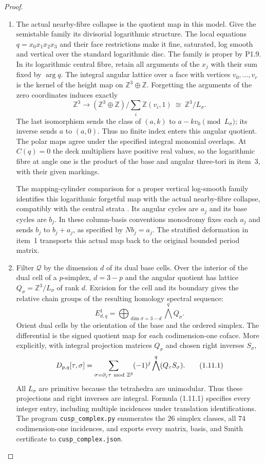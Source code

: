 \begin{proof}
\begin{enumerate}[label=\arabic*.]
\item The actual nearby-fibre collapse is the quotient map in this model.
Give the semistable family its divisorial logarithmic structure.
The local equations $q=x_0x_1x_2x_3$ and their face restrictions
make it fine, saturated, log smooth and vertical over the standard
logarithmic disc.  The family is proper by P1.9.
In its logarithmic central fibre, retain all arguments of the $x_j$
with their sum fixed by $\arg q$.  The integral angular lattice over
a face with vertices $v_0,\ldots,v_r$ is the kernel of the height
map on $\mathbb Z^3\oplus\mathbb Z$.  Forgetting the arguments of
the zero coordinates induces exactly
\[
 \mathbb Z^3\longrightarrow
 (\mathbb Z^3\oplus\mathbb Z)/
       \sum_i\mathbb Z(v_i,1)
 \ \cong\ \mathbb Z^3/L_\sigma.
\]
The last isomorphism sends the class of $(a,k)$ to
$a-kv_0\pmod {L_\sigma}$; its inverse sends $a$ to $(a,0)$.
Thus no finite index enters this angular quotient.
The polar maps agree under the specified integral monomial overlaps.
At $C(q)=0$ the deck multipliers have positive real values, so the
logarithmic fibre at angle one is the product of the base and angular
three-tori in item~3, with their given markings.

The mapping-cylinder comparison for a proper vertical log-smooth
family identifies this logarithmic forgetful map with the actual
nearby-fibre collapse, compatibly with the central strata
\cite[formula (3-3-1), p.~478; Theorem 4.1.1 and Lemmas
4.1.2--4.1.3, pp.~480--482]{ffAchingerOgus20}.
Its angular cycles are $a_j$ and its base cycles are $b_j$.
In these column-basis conventions monodromy fixes each $a_j$
and sends $b_j$ to $b_j+a_j$, as specified by $Nb_j=a_j$.
The stratified deformation in item~1 transports this actual map
back to the original bounded period matrix.

\item Filter $\mathcal Q$ by the dimension $d$ of its dual base cells.
Over the interior of the dual cell of a $p$-simplex, $d=3-p$ and the
angular quotient has lattice
$Q_\sigma=\mathbb Z^3/L_\sigma$ of rank $d$.
Excision for the cell and its boundary gives the relative chain
groups of the resulting homology spectral sequence:
\[
E^1_{d,q}=\bigoplus_{\dim\sigma=3-d}\bigwedge^qQ_\sigma.
\]
Orient dual cells by the orientation of the base and the ordered
simplex.  The differential is the signed quotient map for each
codimension-one coface.  More explicitly, with integral projection
matrices $Q_\sigma$ and chosen right inverses $S_\sigma$,
\[
D_{p,q}[\tau,\sigma]=
 \sum_{\sigma=\partial_j\tau\ {\rm mod}\ \mathbb Z^3}
 (-1)^j\bigwedge^q(Q_\tau S_\sigma).
\tag{1.11.1}
\]
All $L_\sigma$ are primitive because the tetrahedra are unimodular.
Thus these projections and right inverses are integral.  Formula
(1.11.1) specifies every integer entry, including multiple incidences
under translation identifications.  The program
\texttt{cusp\_complex.py} enumerates the $26$ simplex classes, all
$74$ codimension-one incidences, and exports every matrix, basis, and
Smith certificate to \texttt{cusp\_complex.json}.


\end{enumerate}
\end{proof}
